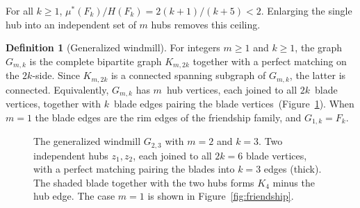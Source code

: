 \documentclass[11pt]{article}
\theoremstyle{definition}
\newtheorem{definition}{Definition}
\theoremstyle{remark}
\newcommand{\mustar}{\mu^{*}}
\begin{document}
For all $k \ge 1$, $\mustar(F_k)/H(F_k) = 2(k+1)/(k+5) < 2$.  Enlarging
the single hub into an independent set of $m$ hubs removes this ceiling.

\begin{definition}[Generalized windmill]\label{def:Gmk}
For integers $m \ge 1$ and $k \ge 1$, the graph $G_{m,k}$ is the complete
bipartite graph $K_{m,2k}$ together with a perfect matching on the $2k$-side.
Since $K_{m,2k}$ is a connected spanning subgraph of $G_{m,k}$, the latter is
connected.
Equivalently, $G_{m,k}$ has $m$~hub vertices, each joined to all $2k$~blade
vertices, together with $k$~blade edges pairing the blade
vertices~(Figure~\ref{fig:windmill}).  When
$m = 1$ the blade edges are the rim edges of the friendship family, and
$G_{1,k} = F_k$.
\end{definition}

\begin{figure}[ht]
\centering
{}
\caption{The generalized windmill $G_{2,3}$ with $m = 2$ and $k = 3$.  Two
independent hubs $z_1, z_2$, each joined to all $2k = 6$ blade vertices, with
a perfect matching pairing the blades into $k = 3$ edges (thick).  The shaded
blade together with the two hubs forms $K_4$ minus the hub edge.  The case
$m = 1$ is shown in Figure~\ref{fig:friendship}.}
\label{fig:windmill}
\end{figure}
\end{document}
